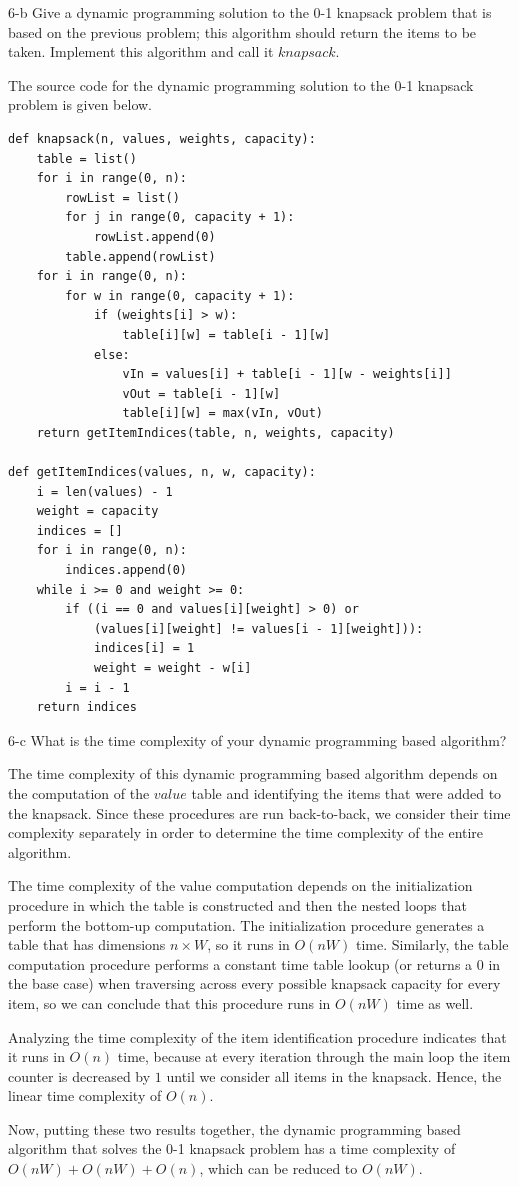 \documentclass[11pt]{article}
\begin{document}
\begin{prob}{6-b}
Give a dynamic programming solution to the 0-1 knapsack problem that is based on the previous problem;
this algorithm should return the items to be taken. Implement this algorithm and call it $knapsack$.
\end{prob}
\begin{sol}
The source code for the dynamic programming solution to the 0-1 knapsack problem is given below.

\begin{lstlisting}
def knapsack(n, values, weights, capacity):
	table = list() 
	for i in range(0, n):
		rowList = list()
		for j in range(0, capacity + 1):
			rowList.append(0)
		table.append(rowList)		
	for i in range(0, n):
		for w in range(0, capacity + 1):
			if (weights[i] > w):
				table[i][w] = table[i - 1][w]
			else:
				vIn = values[i] + table[i - 1][w - weights[i]]
				vOut = table[i - 1][w]
				table[i][w] = max(vIn, vOut)
	return getItemIndices(table, n, weights, capacity)

def getItemIndices(values, n, w, capacity):
	i = len(values) - 1
	weight = capacity
	indices = []	
	for i in range(0, n):
		indices.append(0)
	while i >= 0 and weight >= 0:
		if ((i == 0 and values[i][weight] > 0) or 
			(values[i][weight] != values[i - 1][weight])):
			indices[i] = 1
			weight = weight - w[i]
		i = i - 1
	return indices
\end{lstlisting}
\end{sol}

\begin{prob}{6-c}
What is the time complexity of your dynamic programming based algorithm?
\end{prob}
\begin{sol}
The time complexity of this dynamic programming based algorithm depends on the computation of the $value$ table and identifying the items that were added to the knapsack. Since these procedures are run back-to-back, we consider their time complexity separately in order to determine the time complexity of the entire algorithm.

The time complexity of the value computation depends on the initialization procedure in which the table is constructed and then the nested loops that perform the bottom-up computation. The initialization procedure generates a table that has dimensions $n \times W$, so it runs in $O(nW)$ time. Similarly, the table computation procedure performs a constant time table lookup (or returns a $0$ in the base case) when traversing across every possible knapsack capacity for every item, so we can conclude that this procedure runs in $O(nW)$ time as well.

Analyzing the time complexity of the item identification procedure indicates that it runs in $O(n)$ time, because at every iteration through the main loop the item counter is decreased by $1$ until we consider all items in the knapsack. Hence, the linear time complexity of $O(n)$.

Now, putting these two results together, the dynamic programming based algorithm that solves the 0-1 knapsack problem has a time complexity of $O(nW) + O(nW) + O(n)$, which can be reduced to $O(nW)$. 
\end{sol}
\end{document}
